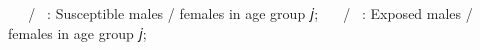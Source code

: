 𝑆𝑚𝑗/𝑆𝑓𝑗: Susceptible males / females in age group  𝑗;
 𝐸𝑚𝑗/𝐸𝑓𝑗: Exposed males / females in age group  𝑗;